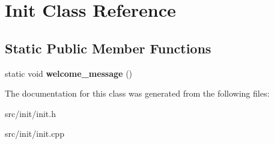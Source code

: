 \hypertarget{class_init}{}\section{Init Class Reference}
\label{class_init}
\subsection*{Static Public Member Functions}
\begin{DoxyCompactItemize}
\item 
\hypertarget{class_init_a6b689ee6f025aef5beba53b6ad97a47f}{}static void {\bfseries welcome\+\_\+message} ()\label{class_init_a6b689ee6f025aef5beba53b6ad97a47f}

\end{DoxyCompactItemize}


The documentation for this class was generated from the following files\+:\begin{DoxyCompactItemize}
\item 
src/init/init.\+h\item 
src/init/init.\+cpp\end{DoxyCompactItemize}
